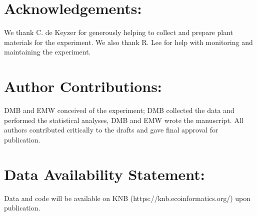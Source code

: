 \documentclass[12pt]{article}\usepackage[]{graphicx}\usepackage[]{color}
\begin{document}
\section*{Acknowledgements:} We thank C. de Keyzer for generously helping to collect and prepare plant materials for the experiment. We also thank R. Lee for help with monitoring and maintaining the experiment.\\

\section*{Author Contributions:} DMB and EMW conceived of the experiment; DMB collected the data and performed the statistical analyses, DMB and EMW wrote the manuscript. All authors contributed critically to the drafts and gave final approval for publication.\\

\section*{Data Availability Statement:} Data and code will be available on KNB (https://knb.ecoinformatics.org/) upon publication.


 
\end{document}
